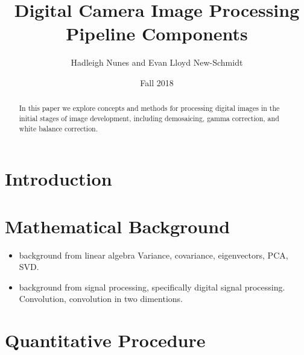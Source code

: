 \documentclass{article}
\title{Digital Camera Image Processing Pipeline Components}
\author{Hadleigh Nunes and Evan Lloyd New-Schmidt}
\date{Fall 2018}
\begin{document}
\maketitle

\begin{abstract}
    In this paper we explore concepts and methods for processing digital images in the initial stages of image development, including demosaicing, gamma correction, and white balance correction.
\end{abstract}

\section{Introduction}


\cite{picameradocs}




\section{Mathematical Background}
\begin{itemize}
    \item background from linear algebra
    Variance, covariance, eigenvectors, PCA, SVD.
    
    \item background from signal processing, specifically digital signal processing.
    Convolution, convolution in two dimentions. 
    
\end{itemize}

\section{Quantitative Procedure}
\end{document}
